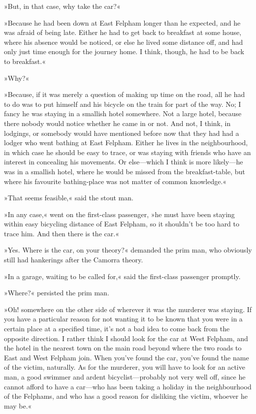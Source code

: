 »But, in that case, why take the car?«

»Because he had been down at East Felpham longer than he expected, and he was afraid of being late. Either he had to get back to breakfast at some house, where his absence would be noticed, or else he lived some distance off, and had only just time enough for the journey home. I think, though, he had to be back to breakfast.«

»Why?«

»Because, if it was merely a question of making up time on the road, all he had to do was to put himself and his bicycle on the train for part of the way. No; I fancy he was staying in a smallish hotel somewhere. Not a large hotel, because there nobody would notice whether he came in or not. And not, I think, in lodgings, or somebody would have mentioned before now that they had had a lodger who went bathing at East Felpham. Either he lives in the neighbourhood, in which case he should be easy to trace, or was staying with friends who have an interest in concealing his movements. Or else—which I think is more likely—he was in a smallish hotel, where he would be missed from the breakfast-table, but where his favourite bathing-place was not matter of common knowledge.«

»That seems feasible,« said the stout man.

»In any case,« went on the first-class passenger, »he must have been staying within easy bicycling distance of East Felpham, so it shouldn't be too hard to trace him. And then there is the car.«

»Yes. Where is the car, on your theory?« demanded the prim man, who obviously still had hankerings after the Camorra theory.

»In a garage, waiting to be called for,« said the first-class passenger promptly.

»Where?« persisted the prim man.

»Oh! somewhere on the other side of wherever it was the murderer was staying. If you have a particular reason for not wanting it to be known that you were in a certain place at a specified time, it's not a bad idea to come back from the opposite direction. I rather think I should look for the car at West Felpham, and the hotel in the nearest town on the main road beyond where the two roads to East and West Felpham join. When you've found the car, you've found the name of the victim, naturally. As for the murderer, you will have to look for an active man, a good swimmer and ardent bicyclist—probably not very well off, since he cannot afford to have a car—who has been taking a holiday in the neighbourhood of the Felphams, and who has a good reason for disliking the victim, whoever he may be.«

